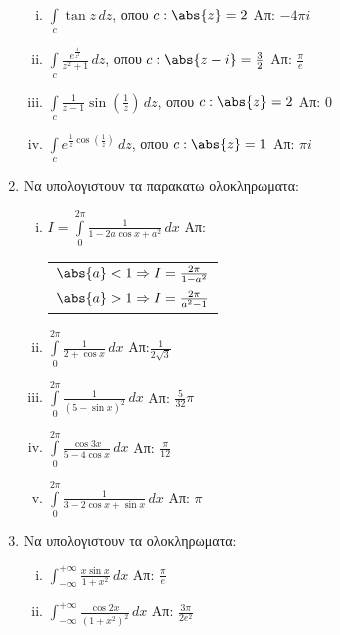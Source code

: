 \begin{enumerate}
\begin{enumerate}[i)]
\item $\int\limits_c\tan z\,dz$, οπου $c:\abs{z}=2$ \hfill Απ: $-4\pi i$

\item $\int\limits_c\frac{e^{\frac{1}{z^2}}}{z^2+1}\,dz$, οπου $c:\abs{z-i}=\frac{3}{2}$ \hfill Απ: $\frac{\pi}{e}$

\item $\int\limits_c\frac{1}{z-1}\sin(\frac{1}{z})\,dz$, οπου $c:\abs{z}=2$ \hfill Απ: $0$

\item $\int\limits_c e^{\frac{1}{z}\cos(\frac{1}{z})}\,dz$, οπου $c:\abs{z}=1$ \hfill Απ: $\pi i$

\end{enumerate}

\item Να υπολογιστουν τα παρακατω ολοκληρωματα:

\begin{enumerate}[i)]

\item $I=\int\limits_0^{2\pi}\frac{1}{1-2a\cos x+a^2}\,dx$ \hfill Απ: \begin{tabular}{c}$\abs{a}<1\Rightarrow I=\frac{2\pi}{1-a^2}$ \\ $\abs{a}>1\Rightarrow I=\frac{2\pi}{a^2-1}$\end{tabular}

\item $\int\limits_0^{2\pi}\frac{1}{2+\cos x}\,dx$ \hfill Απ:$\frac{1}{2\sqrt{3}}$

\item $\int\limits_0^{2\pi}\frac{1}{(5-\sin x)^2}\,dx$ \hfill Απ: $\frac{5}{32}\pi$

\item $\int\limits_0^{2\pi}\frac{\cos 3x}{5-4\cos x}\,dx$ \hfill Απ: $\frac{\pi}{12}$

\item $\int\limits_0^{2\pi}\frac{1}{3-2\cos x+\sin x}\,dx$ \hfill Απ: $\pi$
\end{enumerate}

\item Να υπολογιστουν τα ολοκληρωματα:

\begin{enumerate}[i)]

\item $\int_{-\infty}^{+\infty}\frac{x\sin x}{1+x^2}\,dx$ \hfill  Απ: $\frac{\pi}{e}$

\item $\int_{-\infty}^{+\infty}\frac{\cos 2x}{(1+x^2)^2}\,dx$ \hfill  Απ: $\frac{3\pi}{2e^2}$

\end{enumerate}

\end{enumerate}



